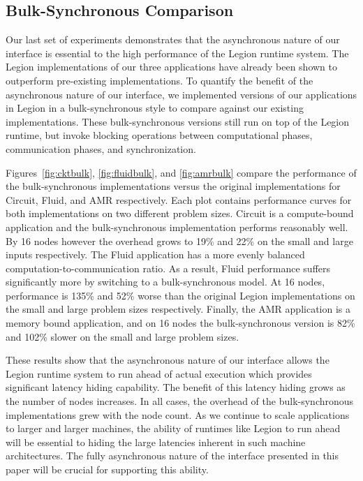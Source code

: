 

\subsection{Bulk-Synchronous Comparison}
\label{subsec:bulkcomp}

Our last set of experiments demonstrates that the asynchronous nature of our interface
is essential to the high performance of the Legion runtime system.  The Legion
implementations of our three applications have already been shown to outperform 
pre-existing implementations\cite{Legion12}.  To quantify the benefit of the asynchronous
nature of our interface, we implemented versions of our applications in
Legion in a bulk-synchronous style to compare against our existing implementations.  
These bulk-synchronous versions still run on top of 
the Legion runtime, but invoke blocking operations between computational phases,
communication phases, and synchronization.

Figures~\ref{fig:cktbulk}, \ref{fig:fluidbulk}, and \ref{fig:amrbulk} compare
the performance of the bulk-synchronous implementations versus the original
implementations for Circuit, Fluid, and AMR respectively.  Each plot contains
performance curves for both implementations on two different problem sizes.
Circuit is a compute-bound application and the bulk-synchronous implementation
performs reasonably well.  By 16 nodes however the overhead grows to 19\%
and 22\% on the small and large inputs respectively.  The Fluid application 
has a more evenly balanced computation-to-communication ratio.  As a result,
Fluid performance suffers significantly more by switching to
a bulk-synchronous model.  At 16 nodes, performance is 135\% and 52\% worse
than the original Legion implementations on the small and large problem sizes
respectively.  Finally, the AMR application is a memory bound application, and on 16 nodes
the bulk-synchronous version is 82\% and 102\% slower on the small and
large problem sizes.

These results show that the asynchronous nature of our interface allows
the Legion runtime system to run ahead of actual execution which
provides significant latency hiding capability.  
The benefit of this latency hiding grows as the number of
nodes increases. %
In all cases, the overhead of the bulk-synchronous
implementations grew with the node count.  As we continue to scale
applications to larger and larger machines, the ability of runtimes like Legion to run ahead
will be essential to hiding the large latencies inherent in such machine architectures.
The fully asynchronous nature of the interface presented in this paper
will be crucial for supporting this ability.


